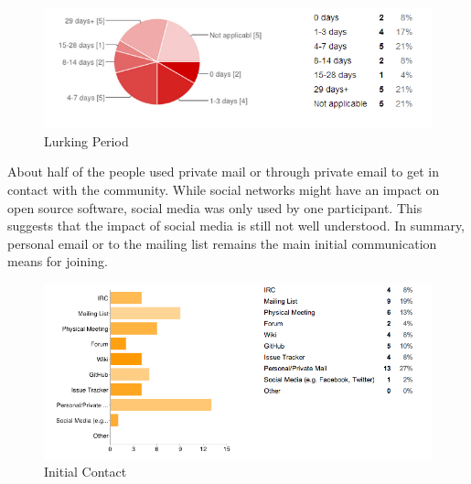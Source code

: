 \begin{figure}[ht!]
\centering
\includegraphics[width=120mm]{chapters/img/lurking_response.png}
\caption{Lurking Period}
\label{fig:lurking_period}
\end{figure}

About half of the people used private mail or through private email to get in contact with the community. While social networks might have an impact on open source software, social media was only used by one participant. This suggests that the impact of social media is still not well understood. In summary, personal email or to the mailing list remains the main initial communication means for joining.

\begin{figure}[ht!]
\centering
\includegraphics[width=120mm]{chapters/img/initial_contact.png}
\caption{Initial Contact}
\label{fig:initial_contact}
\end{figure}